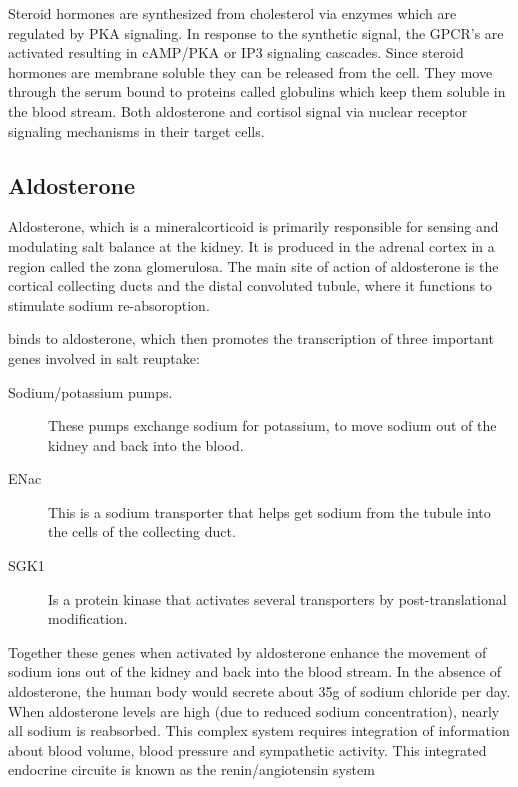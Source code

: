 \documentclass{tufte-handout}
\begin{document}
Steroid hormones are synthesized from cholesterol via enzymes which are regulated by PKA signaling.  In response to the synthetic signal, the GPCR's are activated resulting in cAMP/PKA or IP3 signaling cascades.  Since steroid hormones are membrane soluble they can be released from the cell.  They move through the serum bound to proteins called globulins which keep them soluble in the blood stream.  Both aldosterone and cortisol signal via nuclear receptor signaling mechanisms in their target cells.

\subsection{Aldosterone}

Aldosterone, which is a mineralcorticoid is primarily responsible for sensing and modulating salt balance at the kidney.  It is produced in the adrenal cortex in a region called the zona glomerulosa.  The main site of action of aldosterone is the cortical collecting ducts and the distal convoluted tubule, where it functions to stimulate sodium re-absoroption.  

 binds to aldosterone, which then promotes the transcription of three important genes involved in salt reuptake:

\begin{description}
 \item[Sodium/potassium pumps.]  These pumps exchange sodium for potassium, to move sodium out of the kidney and back into the blood.
 \item[ENac] This is a sodium transporter that helps get sodium from the tubule into the cells of the collecting duct.
 \item[SGK1] Is a protein kinase that activates several transporters by post-translational modification.
\end{description}

Together these genes when activated by aldosterone enhance the movement of sodium ions out of the kidney and back into the blood stream.  In the absence of aldosterone, the human body would secrete about 35g of sodium chloride per day.  When aldosterone levels are high (due to reduced sodium concentration), nearly all sodium is reabsorbed.  This complex system requires integration of information about blood volume, blood pressure and sympathetic activity.  This integrated endocrine circuite is known as the renin/angiotensin system
\end{document}
